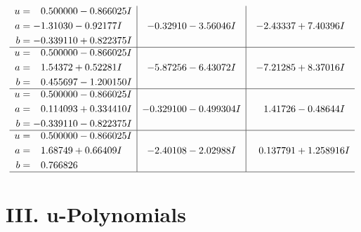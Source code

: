 \documentclass[1p]{elsarticle_modified}
\theoremstyle{definition}
\begin{document}
$$\begin{array}{c|c|c}
\begin{aligned}
u &= \phantom{-}0.500000 - 0.866025 I \\
a &= -1.31030 - 0.92177 I \\
b &= -0.339110 + 0.822375 I\end{aligned}
 & -0.32910 - 3.56046 I & -2.43337 + 7.40396 I \\ \hline\begin{aligned}
u &= \phantom{-}0.500000 - 0.866025 I \\
a &= \phantom{-}1.54372 + 0.52281 I \\
b &= \phantom{-}0.455697 - 1.200150 I\end{aligned}
 & -5.87256 - 6.43072 I & -7.21285 + 8.37016 I \\ \hline\begin{aligned}
u &= \phantom{-}0.500000 - 0.866025 I \\
a &= \phantom{-}0.114093 + 0.334410 I \\
b &= -0.339110 - 0.822375 I\end{aligned}
 & -0.329100 - 0.499304 I & \phantom{-}1.41726 - 0.48644 I \\ \hline\begin{aligned}
u &= \phantom{-}0.500000 - 0.866025 I \\
a &= \phantom{-}1.68749 + 0.66409 I \\
b &= \phantom{-}0.766826\phantom{ +0.000000I}\end{aligned}
 & -2.40108 - 2.02988 I & \phantom{-}0.137791 + 1.258916 I\\
 \hline 
 \end{array}$$\newpage
\newpage\renewcommand{\arraystretch}{1}
\centering \section*{ III. u-Polynomials}
\end{document}

